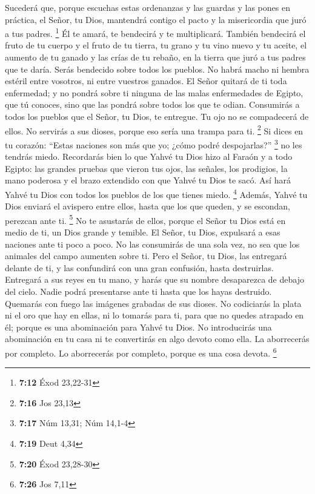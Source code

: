 Sucederá que, porque escuchas estas ordenanzas y las
guardas y las pones en práctica, el Señor, tu Dios, mantendrá contigo el
pacto y la misericordia que juró a tus padres. \footnote{\textbf{7:12}
  Éxod 23,22-31}  Él te amará, te bendecirá y te
multiplicará. También bendecirá el fruto de tu cuerpo y el fruto de tu
tierra, tu grano y tu vino nuevo y tu aceite, el aumento de tu ganado y
las crías de tu rebaño, en la tierra que juró a tus padres que te daría.
 Serás bendecido sobre todos los pueblos. No habrá macho
ni hembra estéril entre vosotros, ni entre vuestros ganados.
 El Señor quitará de ti toda enfermedad; y no pondrá
sobre ti ninguna de las malas enfermedades de Egipto, que tú conoces,
sino que las pondrá sobre todos los que te odian. 
Consumirás a todos los pueblos que el Señor, tu Dios, te entregue. Tu
ojo no se compadecerá de ellos. No servirás a sus dioses, porque eso
sería una trampa para ti. \footnote{\textbf{7:16} Jos 23,13}
 Si dices en tu corazón: ``Estas naciones son más que yo;
¿cómo podré despojarlas?'' \footnote{\textbf{7:17} Núm 13,31; Núm 14,1-4}
 no les tendrás miedo. Recordarás bien lo que Yahvé tu
Dios hizo al Faraón y a todo Egipto:  las grandes pruebas
que vieron tus ojos, las señales, los prodigios, la mano poderosa y el
brazo extendido con que Yahvé tu Dios te sacó. Así hará Yahvé tu Dios
con todos los pueblos de los que tienes miedo. \footnote{\textbf{7:19}
  Deut 4,34}  Además, Yahvé tu Dios enviará el avispero
entre ellos, hasta que los que queden, y se escondan, perezcan ante ti.
\footnote{\textbf{7:20} Éxod 23,28-30}  No te asustarás
de ellos, porque el Señor tu Dios está en medio de ti, un Dios grande y
temible.  El Señor, tu Dios, expulsará a esas naciones
ante ti poco a poco. No las consumirás de una sola vez, no sea que los
animales del campo aumenten sobre ti.  Pero el Señor, tu
Dios, las entregará delante de ti, y las confundirá con una gran
confusión, hasta destruirlas.  Entregará a sus reyes en
tu mano, y harás que su nombre desaparezca de debajo del cielo. Nadie
podrá presentarse ante ti hasta que los hayas destruido. 
Quemarás con fuego las imágenes grabadas de sus dioses. No codiciarás la
plata ni el oro que hay en ellas, ni lo tomarás para ti, para que no
quedes atrapado en él; porque es una abominación para Yahvé tu Dios.
 No introducirás una abominación en tu casa ni te
convertirás en algo devoto como ella. La aborrecerás por completo. Lo
aborrecerás por completo, porque es una cosa devota. \footnote{\textbf{7:26}
  Jos 7,11}

